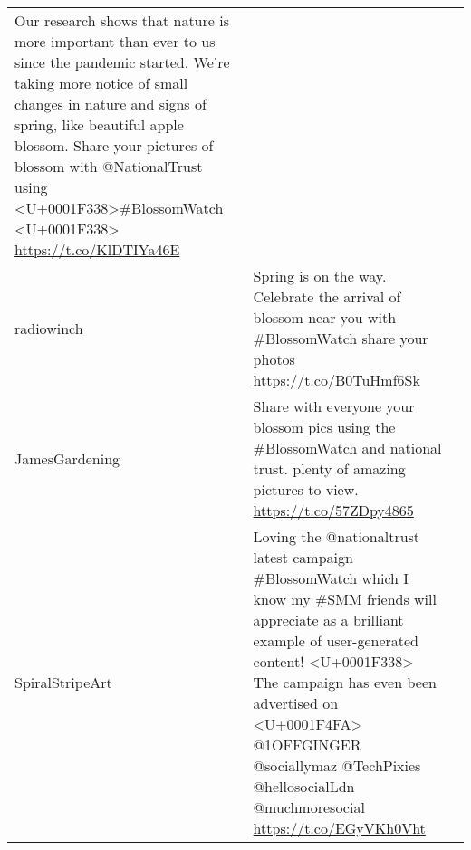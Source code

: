 \documentclass[
]{article}
\begin{document}
\begin{longtable}[]{@{}llr@{}}
\begin{minipage}[t]{0.42\columnwidth}
Our research shows that nature is more important than ever to us since
the pandemic started. We're taking more notice of small changes in
nature and signs of spring, like beautiful apple blossom. Share your
pictures of blossom with @NationalTrust using
\textless U+0001F338\textgreater\#BlossomWatch
\textless U+0001F338\textgreater{} \url{https://t.co/KlDTIYa46E}\strut
\end{minipage} & \begin{minipage}[t]{0.18\columnwidth}\raggedleft
4\strut
\end{minipage}\tabularnewline
\begin{minipage}[t]{0.23\columnwidth}\raggedright
radiowinch\strut
\end{minipage} & \begin{minipage}[t]{0.42\columnwidth}\raggedright
Spring is on the way. Celebrate the arrival of blossom near you with
\#BlossomWatch share your photos \url{https://t.co/B0TuHmf6Sk}\strut
\end{minipage} & \begin{minipage}[t]{0.18\columnwidth}\raggedleft
4\strut
\end{minipage}\tabularnewline
\begin{minipage}[t]{0.23\columnwidth}\raggedright
JamesGardening\strut
\end{minipage} & \begin{minipage}[t]{0.42\columnwidth}\raggedright
Share with everyone your blossom pics using the \#BlossomWatch and
national trust. plenty of amazing pictures to view.
\url{https://t.co/57ZDpy4865}\strut
\end{minipage} & \begin{minipage}[t]{0.18\columnwidth}\raggedleft
3\strut
\end{minipage}\tabularnewline
\begin{minipage}[t]{0.23\columnwidth}\raggedright
SpiralStripeArt\strut
\end{minipage} & \begin{minipage}[t]{0.42\columnwidth}\raggedright
Loving the @nationaltrust latest campaign \#BlossomWatch which I know my
\#SMM friends will appreciate as a brilliant example of user-generated
content! \textless U+0001F338\textgreater{} The campaign has even been
advertised on \textless U+0001F4FA\textgreater{} @1OFFGINGER
@sociallymaz @TechPixies @hellosocialLdn @muchmoresocial
\url{https://t.co/EGyVKh0Vht}\strut
\end{minipage} & \begin{minipage}[t]{0.18\columnwidth}\raggedleft

\end{minipage}
\end{longtable}
\end{document}
